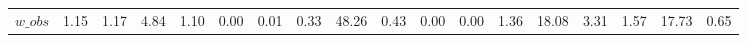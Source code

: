 \begin{center}
\begin{longtable}{lccccccccccccccccc}
$w\_obs         $	 & 	            1.15	 & 	            1.17	 & 	            4.84	 & 	            1.10	 & 	            0.00	 & 	            0.01	 & 	            0.33	 & 	           48.26	 & 	            0.43	 & 	            0.00	 & 	            0.00	 & 	            1.36	 & 	           18.08	 & 	            3.31	 & 	            1.57	 & 	           17.73	 & 	            0.65 \\ 
\end{longtable}
 \end{center}
